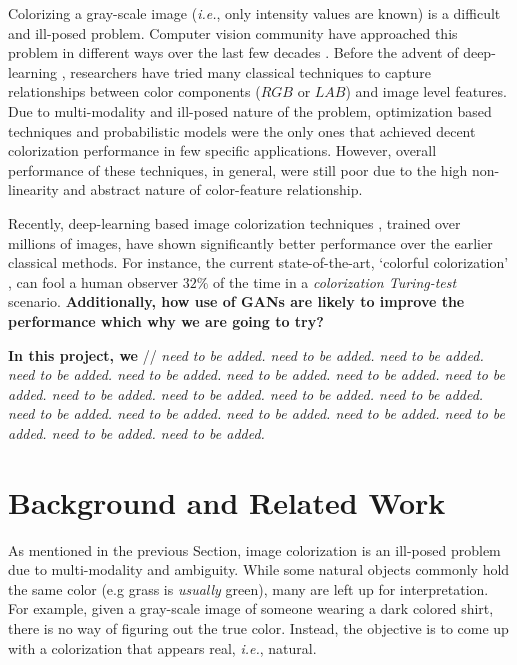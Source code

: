 \documentclass[10pt]{article}
\begin{document}
Colorizing a gray-scale image (\textit{i.e.}, only intensity values are known) is a difficult and ill-posed problem. Computer vision community have approached this problem in different ways over the last few decades \cite{zhang2016colorful, cheng2015deep, bugeau2014variational, charpiat2008automatic, luan2007natural, konushin2006interactive}. Before the advent of deep-learning \cite{lecun2015deep}, researchers have tried many classical techniques \cite{charpiat2008automatic, luan2007natural, konushin2006interactive, levin2004colorization, lagodzinski2008digital} to capture relationships between color components ($RGB$ or $LAB$) and image level features. 
Due to multi-modality and ill-posed nature of the problem, optimization based techniques \cite{levin2004colorization, charpiat2008automatic} and probabilistic models \cite{lagodzinski2008digital} were the only ones that achieved decent colorization performance in few specific applications. 
However, overall performance of these techniques, in general, were still poor due to the high non-linearity and abstract nature of color-feature relationship.  

Recently, deep-learning based image colorization techniques \cite{zhang2016colorful, cheng2015deep, varga2016fully, li2017watergan}, trained over millions of images, have shown significantly better performance over the earlier classical methods. For instance, the current state-of-the-art, `colorful colorization' \cite{zhang2016colorful}, can fool a human observer $32\%$ of the time in a \textit{colorization Turing-test} scenario. \textbf{Additionally,  how use of GANs are likely to improve the performance which why we are going to try?}

\textbf{In this project, we } 
// \textit{need to be added. need to be added. need to be added. need to be added. need to be added. need to be added. need to be added. need to be added.
need to be added. need to be added. need to be added. need to be added. need to be added. need to be added.
need to be added. need to be added. need to be added. need to be added. need to be added.}

\section{Background and Related Work}\label{sec:back}
As mentioned in the previous Section, image colorization is an ill-posed problem due to multi-modality and ambiguity. 
While some natural objects commonly hold the same color (e.g grass is \textit{usually} green), many are left up for interpretation. 
For example, given a gray-scale image of someone wearing a dark colored shirt, 
there is no way of figuring out the true color. 
Instead, the objective is to come up with a colorization that appears real, \textit{i.e.}, natural. 
\end{document}
